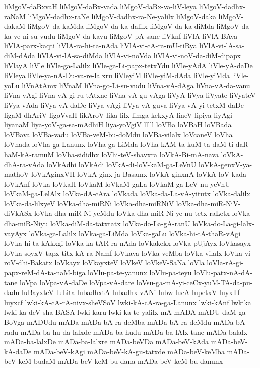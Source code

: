 {liMgoV-daBxvaH
liMgoV-daBx-vada
liMgoV-daBx-va-liV-leya
liMgoV-dadhx-raNaM
liMgoV-dadhx-raNe
liMgoV-dadhx-ra-Ne-yalilx
liMgoV-daka
liMgoV-dakaM
liMgoV-da-kaMda
liMgoV-da-ka-dalilx
liMgoV-da-ka-diMda
liMgoV-da-ka-ve-ni-su-vudu
liMgoV-da-kavu
liMgoV-pA-sane
liVknf
liVlA
liVlA-BAva
liVlA-parx-kaqti
liVlA-ra-hi-ta-nAda
liVlA-vi-cA-ra-mU-tiRya
liVlA-vi-lA-sa-diM-dAda
liVlA-vi-lA-sa-diMda
liVlA-vi-noVda
liVlA-vi-noV-da-diM-dipapx
liVlayA
liVle
liVle-ga-Lalilx
liVle-ga-Li-papx-tetxYdu
liVle-yAdA
liVle-yA-daDe
liVleya
liVle-ya-nA-Du-va-re-lalxru
liVleyiM
liVle-yiM-dAda
liVle-yiMda
liVle-yoLu
liVnAtAmx
liVnaM
liVna-go-Li-su-vudu
liVna-vA-dAga
liVna-vA-da-vanu
liVna-vAgi
liVna-vA-gi-ru-tAtxne
liVna-vA-gu-vAga
liVyA-liVya
liVyate
liVyateV
liVya-vAda
liVya-vA-daDe
liVya-vAgi
liVya-vA-guva
liVya-vA-yi-tetxM-daDe
ligaM-dhAriV
ligoVvaH
likAroV
lika
lilx
limga-kekxyA
lineV
lipiya
liyAgi
liyanaM
liya-yoV-ga-sa-mAdhiH
liya-yoVgiV
lllll
loVBa
loVBaH
loVBada
loVBava
loVBa-vadu
loVBa-veM-bu-doMdu
loVBa-vilalx
loVcaneV
loVha
loVhada
loVha-ga-Lanunx
loVha-ga-LiMda
loVha-kAM-ta-kuM-ta-daM-ti-daR-haM-kA-ramuM
loVha-sididhx
loVhi-teV-shavxra
loVkA-Bi-mA-nava
loVkA-dhA-ra-vAda
loVkAdhi
loVkAdi
loVkA-di-loV-kaM-ga-LeVnU
loVkA-genxV-ya-mathoV
loVkAginxVH
loVkA-ginx-ja-Basamx
loVkA-ginxnA
loVkA-loV-kada
loVkAnf
loVka
loVkaH
loVkaM
loVkaM-gaLa
loVkaM-ga-LeV-nu-yeVnU
loVkaM-ga-LelAlx
loVka-dA-cAra
loVkada
loVka-da-La-vA-yitutx
loVka-dalilx
loVka-da-lilxyeV
loVka-dha-miRNi
loVka-dha-miRNiV
loVka-dha-miR-NiV-diVkASx
loVka-dha-miR-Ni-yeMdu
loVka-dha-miR-Ni-ye-nu-tetx-raLetx
loVka-dha-miR-Niyu
loVka-diM-da-tatxtatx
loVka-do-La-gA-ranU
loVka-do-La-gi-lalx-vayAyx
loVka-ga-Lalilx
loVka-ga-LiMda
loVka-gaLu
loVka-hi-tA-thaR-vAgi
loVka-hi-ta-kAkxgi
loVka-ka-tAR-ra-nAda
loVkakekx
loVka-pUjAyx
loVkasayx
loVka-soyxV-tapx-titx-kA-ra-Namf
loVkava
loVka-veMba
loVka-vilalx
loVka-vi-roV-dhi-Bakatx
loVkayx
loVkayxteV
loVkeV
loVkeV-SaNa
loVla
loVla-rA-gi-papx-reM-dA-ta-naM-biga
loVlu-pa-te-yanunx
loVlu-pa-teyu
loVlu-patx-nA-dA-tane
loVpa
loVpa-vA-daDe
loVpa-vA-dare
loVsu-ga-mA-yi-ceCx-yuM-TA-da-pu-dadu
luBayxteV
luLita
lubadhxtA
lubadhx-vANi
lubw
lucA
lupetxV
luyxTf
luyxcf
lwki-kA-cA-rA-nivx-sheVSoV
lwki-kA-cA-ra-ga-Lanunx
lwki-kAnf
lwkika
lwki-ka-deV-sha-BASA
lwki-karu
lwki-ka-te-yalilx
mA
mADA
mADU-daM-ga-BoVga
mADUdu
mADa
mADa-bA-ra-deMba
mADa-bA-ra-deMdu
mADa-bA-radu
mADa-ba-hu-da-lalxde
mADa-ba-hudu
mADa-ba-lAlx-tane
mADa-balalx
mADa-ba-lalxDe
mADa-ba-lalxre
mADa-beVDa
mADa-beV-kAda
mADa-beV-kA-daDe
mADa-beV-kAgi
mADa-beV-kA-gu-tatxde
mADa-beV-keMba
mADa-beV-keM-budaM
mADa-beV-keM-bu-dana
mADa-beV-keM-bu-danunx
}
